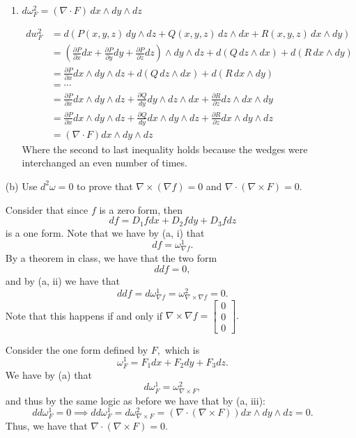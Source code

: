 \documentclass[11pt]{article}
\begin{document}
\begin{enumerate}
\begin{enumerate}
        \item \(d\omega^2_F = (\nabla \cdot F)\,dx \wedge dy \wedge dz\)
        \begin{solution}
            \begin{align*}
                d w^2_F &= d\left(P(x, y, z)\,dy \wedge dz + Q(x, y, z)\,dz \wedge dx + R(x, y, z)\,dx \wedge dy\right)\\
                &= \left(\frac{\partial P}{\partial x} dx + \frac{\partial P}{\partial y} dy + \frac{\partial P}{\partial z} dz\right)\wedge dy \wedge dz + d(Q \,dz\wedge dx) + d(R \, dx \wedge dy)\\
                &= \frac{\partial P}{ \partial x}dx \wedge dy \wedge dz+ d(Q \,dz\wedge dx) + d(R \, dx \wedge dy)\\
                &= \cdots\\
                &= \frac{\partial P}{ \partial x}dx \wedge dy \wedge dz+ \frac{\partial Q}{dy} dy \wedge dz\wedge dx + \frac{\partial R}{\partial z}dz \wedge dx \wedge dy\\
                &= \frac{\partial P}{ \partial x}dx \wedge dy \wedge dz+ \frac{\partial Q}{dy} dx \wedge dy\wedge dz + \frac{\partial R}{\partial z}dx \wedge dy \wedge dz\\
                &= (\nabla \cdot F)dx \wedge dy \wedge dz
            \end{align*}
            Where the second to last inequality holds because the wedges were interchanged an even number of times.
        \end{solution}
    \end{enumerate}
    
    \item[(b)] Use \(d^2\omega = 0\) to prove that \(\nabla \times (\nabla f) = 0\) and \(\nabla \cdot (\nabla \times F) = 0\).
    \begin{solution}
            Consider that since $f$ is a zero form, then 
    \[df = D_1fdx + D_2fdy + D_3f dz\] is a one form. Note that we have by (a, i) that 
    \[df = \omega^1_{\nabla f}.\] By a theorem in class, we have that the two form
    \[ddf = 0,\] and by (a, ii) we have that 
    \[ddf = d\omega^1_{\nabla f} = \omega^2_{\nabla \times \nabla f} = 0.\] Note that this happens if and only if $\nabla \times \nabla f = \begin{bmatrix}
        0\\0\\0
    \end{bmatrix}.$

        Consider the one form defined by $F,$ which is
    \[\omega^1_F = F_1dx + F_2dy + F_3dz.\] We have by (a) that 
    \[d\omega^1_F = \omega^2_{\nabla \times F},\] and thus by the same logic as before we have that by (a, iii):
    \[dd\omega^1_F = 0\implies dd\omega^1_F = d\omega^2_{\nabla \times F} = (\nabla \cdot ({\nabla \times F}))dx\wedge dy\wedge dz = 0.\]
    Thus, we have that $\nabla \cdot ({\nabla \times F}) = 0.$
    \end{solution}
\end{enumerate}
\end{document}
